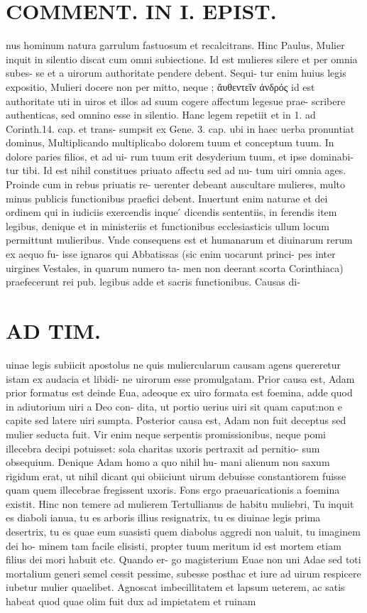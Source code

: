 \documentclass{article}
\begin{document}
\begin{pages}
\section*{COMMENT. IN I. EPIST. }\pstart nus hominum natura garrulum fastuosum et recalcitrans. Hinc Paulus, Mulier inquit in silentio discat cum omni subiectione. Id est mulieres silere et per omnia subes- se et a uirorum authoritate pendere debent. Sequi- tur enim huius legis expositio, Mulieri docere non per mitto, neque ; ἄυθεντεῖν ἀνδρός id est authoritate uti in uiros et illos ad suum cogere affectum legesue prae- scribere authenticas, sed omnino esse in silentio. Hanc legem repetiit et in 1. ad Corinth.14. cap. et trans- sumpsit ex Gene. 3. cap. ubi in haec uerba pronuntiat dominus, Multiplicando multiplicabo dolorem tuum et conceptum tuum. In dolore paries filios, et ad ui- rum tuum erit desyderium tuum, et ipse dominabi- tur tibi. Id est nihil constitues priuato affectu sed ad nu- tum uiri omnia ages. Proinde cum in rebus priuatis re- uerenter debeant auscultare mulieres, multo minus publicis functionibus praefici debent. Inuertunt enim naturae et dei ordinem qui in iudiciis exercendis inque ́ dicendis sententiis, in ferendis item legibus, denique  et in ministeriis et functionibus ecclesiasticis ullum locum permittunt mulieribus. Vnde consequens est et humanarum et diuinarum rerum ex aequo fu- isse ignaros qui Abbatissas (sic enim uocarunt princi- pes inter uirgines Vestales, in quarum numero ta- men non deerant scorta Corinthiaca) praefecerunt rei pub. legibus adde et sacris functionibus. Causas di-  \pend
\section*{AD TIM. }
\marginpar{[ p.121 ]}\pstart uinae legis subiicit apostolus ne quis muliercularum causam agens quereretur istam ex audacia et libidi- ne uirorum esse promulgatam. Prior causa est, Adam prior formatus est deinde Eua, adeoque ex uiro formata est foemina, adde quod in adiutorium uiri a Deo con- dita, ut portio uerius uiri sit quam caput:non e capite sed latere uiri sumpta. Posterior causa est, Adam non fuit deceptus sed mulier seducta fuit. Vir enim neque  serpentis promissionibus, neque pomi illecebra decipi potuisset: sola charitas uxoris pertraxit ad pernitio- sum obsequium. Denique Adam homo a quo nihil hu- mani alienum non saxum rigidum erat, ut nihil dicant qui obiiciunt uirum debuisse constantiorem fuisse quam quem illecebrae fregissent uxoris. Fons ergo praeuaricationis a foemina existit. Hinc non temere ad mulierem Tertullianus de habitu muliebri, Tu inquit es diaboli ianua, tu es arboris illius resignatrix, tu es diuinae legis prima desertrix, tu es quae eum suasisti quem diabolus aggredi non ualuit, tu imaginem dei ho- minem tam facile elisisti, propter tuum meritum id est mortem etiam filius dei mori habuit etc. Quando er- go magisterium Euae non uni Adae sed toti mortalium generi semel cessit pessime, subesse posthac et iure ad uirum respicere iubetur mulier quaelibet. Agnoscat imbecillitatem et lapsum ueterem, ac satis habeat quod quae olim fuit dux ad impietatem et ruinam  \pend

\end{pages}
\end{document}
